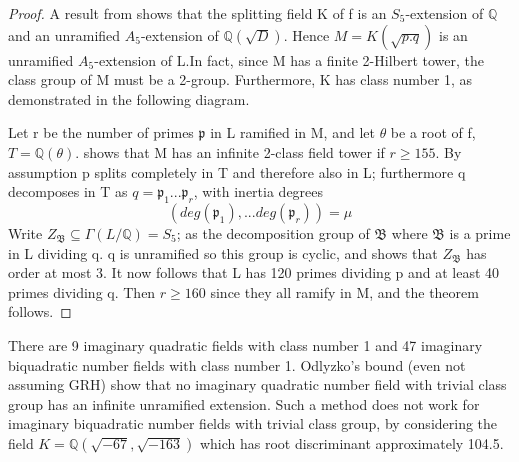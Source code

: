 \documentclass[12pt]{extarticle}
\newcommand{\Q}{\mathbb{Q}}
\newcommand{\<}{\langle}
\renewcommand{\>}{\rangle}
\theoremstyle{definition}
\begin{document}
\begin{proof}
A result from \cite{} shows that the splitting field K
of f is an $S_5$-extension of $\mathbb{Q}$ and an unramified $A_5$-extension of $\mathbb{Q}(\sqrt{D})$. Hence $M=K(\sqrt{p.q})$ is an
unramified $A_5$-extension of L.In fact, since M has a finite 2-Hilbert tower, the class group of M must be a 2-group.  Furthermore, K has class number 1, as demonstrated in the following diagram.
\begin{center}
\end{center}

Let r be the number of primes $\mathfrak{p}$ in L ramified in M, and let $\theta$ be a root of f, $T = \mathbb{Q}(\theta)$. \cite{MART1978} shows that M has an infinite 2-class field tower if $r\geq 155$. By assumption p splits completely in T and therefore also in L; furthermore q decomposes in T as $q = \mathfrak{p}_1...\mathfrak{p}_r$, with inertia degrees
\begin{equation}
    (deg(\mathfrak{p}_1),...deg(\mathfrak{p}_r))=\mu 
\end{equation}
Write $Z_\mathfrak{B}\subseteq\Gamma(L/\Q) = S_5$; as the decomposition group of $\mathfrak{B}$ where $\mathfrak{B}$ is a prime in L dividing q. q is unramified so this group is cyclic, and \cite{MART1978} shows that $Z_\mathfrak{B}$ has order at most 3.  It now follows that L has 120 primes dividing p and at least 40 primes dividing q. Then $r\geq 160$ since they all ramify in M, and the theorem follows.
\end{proof}
There are 9 imaginary quadratic fields with class number 1 and 47 imaginary biquadratic number fields with class number 1. Odlyzko's bound (even not assuming GRH) show that no imaginary quadratic number field with trivial class group has an infinite unramified extension. Such a method does not work for imaginary biquadratic number fields with trivial class group, by considering the field $K=\mathbb{Q}(\sqrt{-67},\sqrt{-163})$ which has root discriminant approximately 104.5.
\end{document}
